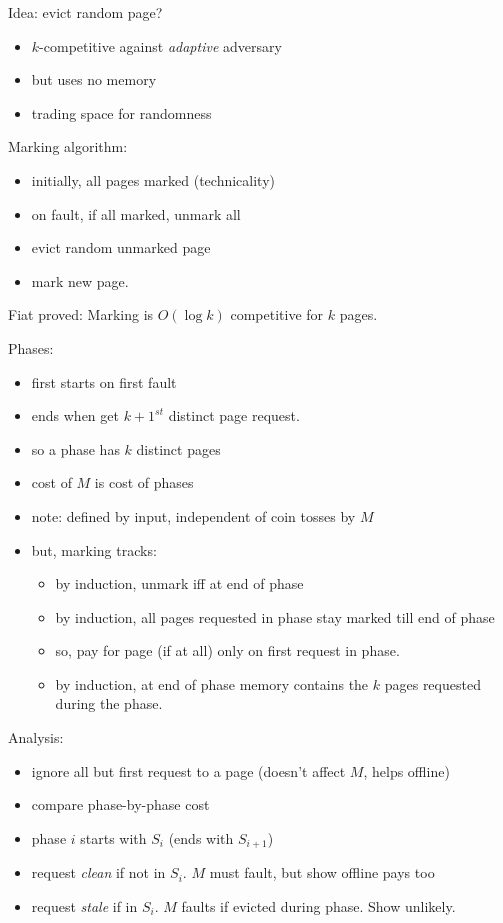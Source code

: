 \documentclass{article}
\begin{document}
Idea: evict random page?
\begin{itemize}
\item $k$-competitive against \emph{adaptive} adversary
\item but uses no memory
\item trading space for randomness
\end{itemize}


Marking algorithm:
\begin{itemize}
\item initially, all pages marked (technicality)
\item on fault, if all marked, unmark all
\item evict random unmarked page
\item mark new page.
\end{itemize}

Fiat proved: Marking is $O(\log k)$ competitive for $k$ pages.

Phases:
\begin{itemize}
\item first starts on first fault
\item ends when get $k+1^{st}$ distinct page request.
\item so a phase has $k$ distinct pages
\item cost of $M$ is cost of phases
\item note: defined by input, independent of coin tosses by $M$
\item but, marking tracks:
\begin{itemize}
\item by induction, unmark iff at end of phase
\item by induction, all pages requested in phase stay marked till end
  of phase
\item so, pay for page (if at all) only on first request in phase.
\item by induction, at end of phase memory contains the $k$ pages
  requested during the phase.
\end{itemize}
\end{itemize}

Analysis:
\begin{itemize}
\item ignore all but first request to a page (doesn't affect $M$,
  helps offline)
\item compare phase-by-phase cost
\item phase $i$ starts with $S_i$ (ends with $S_{i+1}$)
\item request \emph{clean} if not in $S_i$.  $M$ must fault, but show
  offline pays too
\item request \emph{stale} if in $S_i$.  $M$ faults if evicted during
  phase.  Show unlikely.
\end{itemize}
\end{document}
